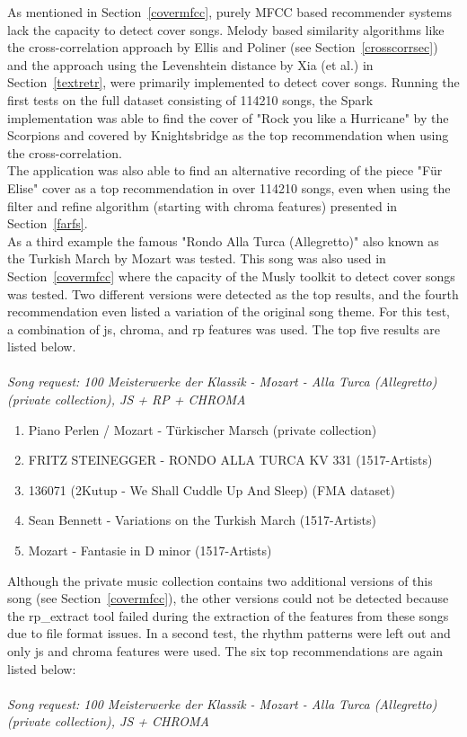 As mentioned in Section~\ref{covermfcc}, purely MFCC based recommender systems lack the capacity to detect cover songs. Melody based similarity algorithms like the cross-correlation approach by Ellis and Poliner (see Section~\ref{crosscorrsec}) and the approach using the Levenshtein distance by Xia (et al.) in Section~\ref{textretr}, were primarily implemented to detect cover songs. 
\noindent Running the first tests on the full dataset consisting of 114210 songs, the Spark implementation was able to find the cover of "Rock you like a Hurricane" by the Scorpions and covered by Knightsbridge as the top recommendation when using the cross-correlation.\\
\noindent The application was also able to find an alternative recording of the piece "Für Elise" cover as a top recommendation in over 114210 songs, even when using the filter and refine algorithm (starting with chroma features) presented in Section~\ref{farfs}.\\
\noindent As a third example the famous "Rondo Alla Turca (Allegretto)" also known as the Turkish March by Mozart was tested. This song was also used in Section~\ref{covermfcc} where the capacity of the Musly toolkit to detect cover songs was tested. \noindent Two different versions were detected as the top results, and the fourth recommendation even listed a variation of the original song theme. 
For this test, a combination of js, chroma, and rp features was used. The top five results are listed below.\\
\ \\
\textit{\noindent Song request: 100 Meisterwerke der Klassik - Mozart - Alla Turca (Allegretto) (private collection), JS + RP + CHROMA}

\begin{enumerate}
	\setlength\itemsep{-0.5em}
	\item Piano Perlen / Mozart - Türkischer Marsch (private collection)
	\item FRITZ STEINEGGER - RONDO ALLA TURCA KV 331 (1517-Artists)
	\item 136071 (2Kutup - We Shall Cuddle Up And Sleep) (FMA dataset)
	\item Sean Bennett - Variations on the Turkish March (1517-Artists)
	\item Mozart - Fantasie in D minor (1517-Artists)
\end{enumerate}

\noindent Although the private music collection contains two additional versions of this song (see Section~\ref{covermfcc}), the other versions could not be detected because the rp\_extract tool failed during the extraction of the features from these songs due to file format issues. In a second test, the rhythm patterns were left out and only js and chroma features were used. The six top recommendations are again listed below:\\
\ \\
\textit{\noindent Song request: 100 Meisterwerke der Klassik - Mozart - Alla Turca (Allegretto) (private collection), JS + CHROMA}

